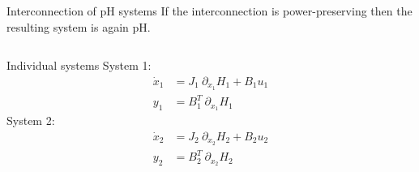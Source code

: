 \documentclass[aspectratio=169]{ISAE-Beamer}
\begin{document}
\begin{frame}{Interconnection of pH systems}
If the interconnection is power-preserving then the resulting system is again pH.
\begin{columns}[T]
	\begin{column}{.25\textwidth}
		\begin{block}{Individual systems}
			System 1:
			\begin{align*}
			\dot{x}_1 &= J_1 \ \partial_{x_1}{H_1} + B_1 u_1 \\
			y_1 &= B_1^T \ \partial_{x_1}{H_1}
			\end{align*}
			System 2:
			\begin{align*}
			\dot{x}_2 &= J_2 \ \partial_{x_2}{H_2} + B_2 u_2 \\
			y_2 &= B_2^T \ \partial_{x_2}{H_2}
			\end{align*}	
		\end{block}
	\end{column}
\end{columns}
\end{frame}
\end{document}
